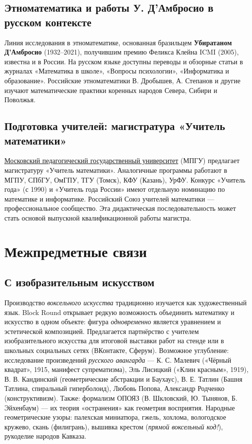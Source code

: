 \documentclass[12pt,a4paper]{scrartcl}
\newcommand{\acc}[1]{\textcolor{accent}{\textbf{#1}}}
\begin{document}
\subsection{Этноматематика и работы У. Д'Амбросио в русском контексте}

Линия исследования в этноматематике, основанная бразильцем \acc{Убиратаном Д'Амбросио} (1932--2021), получившим премию Феликса Клейна ICMI (2005), известна и в России. На русском языке доступны переводы и обзорные статьи в журналах «Математика в школе», «Вопросы психологии», «Информатика и образование». Российские этноматематики В. Дробышев, А. Степанов и другие изучают математические практики коренных народов Севера, Сибири и Поволжья.

\subsection{Подготовка учителей: магистратура «Учитель математики»}

\href{https://мпгу.рф/}{Московский педагогический государственный университет} (МПГУ) предлагает магистратуру «Учитель математики». Аналогичные программы работают в МГПУ, СПбГУ, ОмГПУ, ТГУ (Томск), КФУ (Казань), УрФУ. Конкурс «Учитель года» (с 1990) и «Учитель года России» имеют отдельную номинацию по математике и информатике. Российский Союз учителей математики --- профессиональное сообщество. Эта дидактическая последовательность может стать основой выпускной квалификационной работы магистра.

\section{Межпредметные связи}\label{sec:interdisc}

\subsection{С изобразительным искусством}
Производство \emph{воксельного искусства} традиционно изучается как художественный язык. Block Round открывает редкую возможность объединить математику и искусство в одном объекте: фигура \emph{одновременно} является уравнением и эстетической композицией. Предлагается партнёрство с учителем изобразительного искусства для итоговой выставки работ на стенде или в школьных социальных сетях (ВКонтакте, Сферум). Возможное углубление: исследование произведений \emph{русского авангарда} --- К. С. Малевич («Чёрный квадрат», 1915, манифест супрематизма), Эль Лисицкий («Клин красным», 1919), В. В. Кандинский (геометрические абстракции и Баухаус), В. Е. Татлин (Башня Татлина, спиральный гиперболоид), Любовь Попова, Александр Родченко (конструктивизм). Также: формализм ОПОЯЗ (В. Шкловский, Ю. Тынянов, Б. Эйхенбаум) --- их теория «остранения» как геометрия восприятия. Народные геометрические узоры: палехская миниатюра, гжель, хохлома, вологодское кружево, скань (филигрань), вышивка крестом (\emph{прямой воксельный код!}), рукоделие народов Кавказа.
\end{document}
